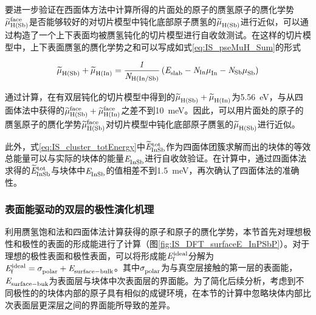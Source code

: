 要进一步验证在西面体方法中计算所得的片面处的原子的赝氢原子的赝化学势$\it \widetilde{\mu}_{\rm H\left(Sb\right)}^{\rm face} \it$是否能够较好的对切片模型中钝化底部原子赝氢的$\it \widetilde{\mu}_{\rm H\left(Sb\right)}^{\rm } \it$进行近似，可以通过构造了一个上下表面均被赝氢钝化的切片模型进行自收敛测试。在这样的切片模型中，上下表面赝氢的赝化学势之和可以写成如式\eqref{eq:IS_pseMuH_Sum}的形式\chinesecolon

\begin{equation}
    \label{eq:IS_pseMuH_Sum}
    \it \widetilde{\mu}_{\rm H\left(Sb\right)}^{\rm } \it+\it \widetilde{\mu}_{\rm H\left(In\right)}^{\rm } \it=\frac{1}{N_{\rm H \left(In/ Sb\right)}} \left(\it E_{\rm slab}^{\rm } \it-N_{\rm In}\it \mu_{\rm In}^{\rm } \it-N_{\rm Sb}\it \mu_{\rm Sb}^{\rm } \it\right)
\end{equation}

通过计算，在有双层钝化的切片模型中得到的$\it \widetilde{\mu}_{\rm H\left(Sb\right)}^{\rm } \it+\it \widetilde{\mu}_{\rm H\left(In\right)}^{\rm } \it$为\SI{5.56}{\electronvolt}，与从四面体法中获得的$\it \widetilde{\mu}_{\rm H\left(Sb\right)}^{\rm face} \it+\it \widetilde{\mu}_{\rm H\left(In\right)}^{\rm face} \it$之差不到\SI{10}{\milli\electronvolt}。因此，可以用片面处的原子的赝氢原子的赝化学势$\it \widetilde{\mu}_{\rm H\left(Sb\right)}^{\rm face} \it$对切片模型中钝化底部原子赝氢的$\it \widetilde{\mu}_{\rm H\left(Sb\right)}^{\rm } \it$进行近似。

此外，式\eqref{eq:IS_cluster_totEnergy}中$\it \widetilde{E}_{\rm InSb}^{\rm tot} \it$作为四面体团簇求解而出的块体的等效总能量可以与实际的块体的能量$\it E_{\rm InSb}^{\rm } \it$进行自收敛验证。在计算中，通过四面体法求得的$\it \widetilde{E}_{\rm InSb}^{\rm tot} \it$与块体中$\it E_{\rm InSb}^{\rm } \it$的值相差不到\SI{1.5}{\milli\electronvolt}，再次确认了四面体法的准确性。

\subsubsection{表面能驱动的双层的极性演化机理}

利用赝氢饱和法和四面体法计算获得的原子和原子的赝化学势，本节首先对理想极性和极性的表面的形成能进行了计算（图\ref{fig:IS_DFT_surfaceE_InPSbP}）。对于理想的极性表面和极性表面，可以将形成能$\it E_{\rm f}^{\rm ideal} \it$分解为$\it E_{\rm f}^{\rm ideal} \it=\it \sigma_{\rm polar}^{\rm } \it+\it E_{\rm surface-bulk}^{\rm } \it$。其中$\it \sigma_{\rm polar}^{\rm } \it$为与真空层接触的第一层的表面能，$\it E_{\rm surface-buk}^{\rm } \it$为表面层与块体中次表面层的界面能。为了简化后续分析，考虑到不同极性的的块体内部的原子具有相似的成键环境，在本节的计算中忽略块体内部比次表面层更深层之间的界面能所导致的差异。

